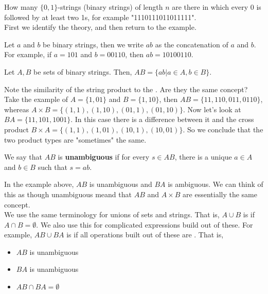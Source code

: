 \documentclass[english, 11pt]{article}
\begin{document}
   \begin{exmp}
     How many $\{0,1\}$-strings (binary strings) of length $n$ are there in which every 0 is followed by at least two 1s, for example "1110111011011111". \\

     First we identify the theory, and then return to the example.

     \begin{defn}[concatenation]\label{concatenation}
     Let $a$ and $b$ be binary strings, then we write $ab$ as the concatenation of $a$ and $b$. For example, if $a = 101$ and $b = 00110$, then $ab = 10100110$.
     \end{defn}

     \begin{defn}\label{string product}
     Let $A, B$ be sets of binary strings. Then, $AB = \{ ab | a \in A, b \in B\}$.
     \end{defn}

     Note the similarity of the string product to the . Are they the same concept? Take the example of $A = \{ 1, 01\}$ and $B = \{ 1, 10 \}$, then $AB = \{11,110,011,0110\}$, whereas $A \times B = \{ (1,1), (1,10), (01,1), (01, 10) \}$. Now let's look at $BA = \{ 11, 101, 1001 \}$. In this case there is a difference between it and the cross product $B \times A = \{ (1,1), (1,01), (10,1), (10,01) \}$. So we conclude that the two product types are "sometimes" the same.

     \begin{defn}[unambiguous]\label{unambiguous}
       We say that $AB$ is {\bf unambiguous} if for every $s \in AB$, there is a unique $a \in A$ and $b \in B$ such that $s = ab$.
     \end{defn}

     In the example above, $AB$ is unambiguous and $BA$ is ambiguous. We can think of this as though unambiguous meand that $AB$ and $A \times B$ are essentially the same concept. \\

     We use the same terminology for unions of sets and strings. That is, $A \cup B$ is  if $A \cap B = \emptyset$. We also use this for complicated expressions build out of these. For example, $AB \cup BA$ is  if all operations built out of these are . That is,
     \begin{itemize}
       \item $AB$ is unambiguous
       \item $BA$ is unambiguous
       \item $AB \cap BA = \emptyset$
     \end{itemize}


\end{exmp}
\end{document}
